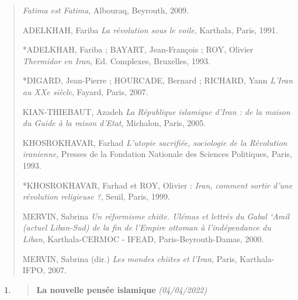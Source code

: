 \begin{quote}
\emph{Fatima est Fatima}, Albouraq, Beyrouth, 2009.

ADELKHAH, Fariba \emph{La révolution sous le voile}, Karthala, Paris,
1991.

*ADELKHAH, Fariba ; BAYART, Jean-François ; ROY, Olivier \emph{Thermidor
en Iran}, Ed. Complexes, Bruxelles, 1993.

*DIGARD, Jean-Pierre ; HOURCADE, Bernard ; RICHARD, Yann \emph{L'Iran au
XXe siècle}, Fayard, Paris, 2007.

KIAN-THIEBAUT, Azadeh \emph{La République islamique d'Iran : de la
maison du Guide à la raison d'Etat}, Michalon, Paris, 2005.

KHOSROKHAVAR, Farhad \emph{L'utopie sacrifiée, sociologie de la
Révolution iranienne}, Presses de la Fondation Nationale des Sciences
Politiques, Paris, 1993.

*KHOSROKHAVAR, Farhad et ROY, Olivier : \emph{Iran, comment sortir d'une
révolution religieuse ?}, Seuil, Paris, 1999.

MERVIN, Sabrina \emph{Un réformisme chiite. Ulémas et lettrés du Gabal
`Amil (actuel Liban-Sud) de la fin de l'Empire ottoman à l'indépendance
du Liban}, Karthala-CERMOC - IFEAD, Paris-Beyrouth-Damas, 2000.

MERVIN, Sabrina (dir.) \emph{Les mondes chiites et l'Iran}, Paris,
Karthala-IFPO, 2007.
\end{quote}

\begin{enumerate}
\def\labelenumi{\arabic{enumi}.}
\item
  \begin{quote}
  \textbf{{La nouvelle pensée islamique}} \emph{(04/04/2022)}
  \end{quote}
\end{enumerate}

